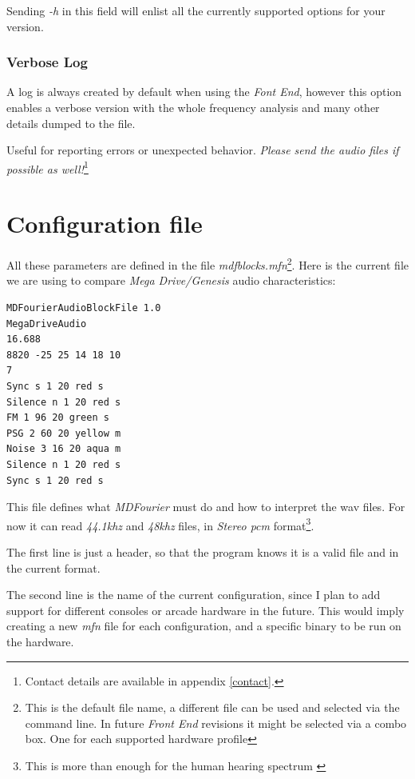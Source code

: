 \documentclass[10pt,a4paper]{report}
\newcommand{\fkhz}[1]{\textit{#1\acrshort{khz}}}
\begin{document}
\begin{appendices}
Sending \textit{-h} in this field will enlist all the currently supported options for your version.

\subsection{Verbose Log}
\label{verbose}

A log is always created by default when using the \textit{Font End}, however this option enables a verbose version with the whole frequency analysis and many other details dumped to the file. 

Useful for reporting errors or unexpected behavior. \textit{Please send the audio files if possible as well!}\footnote{Contact details are available in appendix \ref{contact}.}
	
\chapter{Configuration file}
\label{mfnconfig}

All these parameters are defined in the file \textit{mdfblocks.mfn}\footnote{This is the default file name, a different file can be used and selected via the command line. In future \textit{Front End} revisions it might be selected via a combo box. One for each supported hardware profile}. Here is the current file we are using to compare \textit{Mega Drive/Genesis} audio characteristics:

\begin{verbatim}
MDFourierAudioBlockFile 1.0
MegaDriveAudio
16.688
8820 -25 25 14 18 10
7
Sync s 1 20 red s
Silence n 1 20 red s
FM 1 96 20 green s
PSG 2 60 20 yellow m
Noise 3 16 20 aqua m
Silence n 1 20 red s
Sync s 1 20 red s
\end{verbatim}

This file defines what \textit{MDFourier} must do and how to interpret the \acrshort{wav} files. For now it can read \fkhz{44.1} and \fkhz{48} files, in \textit{Stereo \acrshort{pcm}} format\footnote{This is more than enough for the human hearing spectrum \cite{MontyMontgomery}}.

The first line is just a header, so that the program knows it is a valid file and in the current format.

The second line is the name of the current configuration, since I plan to add support for different consoles or arcade hardware in the future. This would imply creating a new \textit{mfn} file for each configuration, and a specific binary to be run on the hardware.


\end{appendices}
\end{document}

